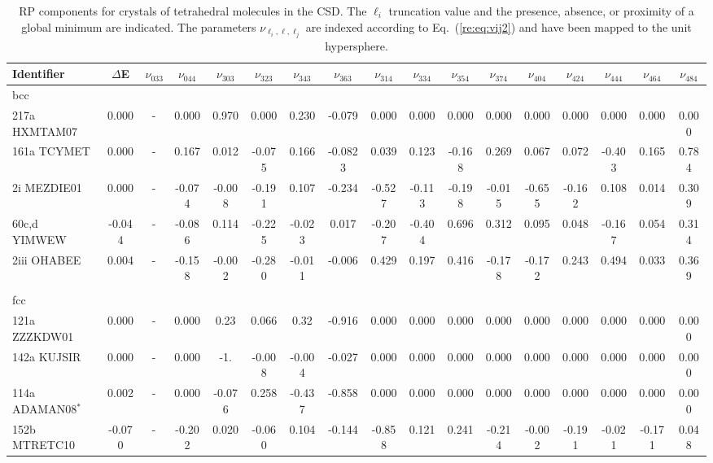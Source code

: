 \documentclass[preprint]{revtex4}
\begin{document}
\begin{table}[!ht]
\caption{RP components for crystals of tetrahedral molecules in the
CSD.  The $\ell_i$ truncation value and the presence, absence, or
proximity of a global minimum are indicated. The parameters
$\nu_{\ell_i,\ell,\ell_j}$ are indexed according to
Eq.~(\ref{re:eq:vij2}) and have been mapped to the unit hypersphere.}
\label{RPTop} \tiny
\begin{tabular}{lcccccccccccccccc}\hline
Identifier & $\Delta$E & $\nu_{033}$ & $\nu_{044}$ & $\nu_{303}$ &
$\nu_{323}$ & $\nu_{343}$ & $\nu_{363}$ & $\nu_{314}$ & $\nu_{334}$
& $\nu_{354}$ & $\nu_{374}$ & $\nu_{404}$ & $\nu_{424}$ &
$\nu_{444}$ & $\nu_{464}$ & $\nu_{484}$ \\
\hline
bcc\\
217a HXMTAM07 & 0.000 & - & 0.000 & 0.970 & 0.000 & 0.230 & -0.079 & 0.000 & 0.000 & 0.000 & 0.000 & 0.000 & 0.000 & 0.000 & 0.000 & 0.000 \\
161a TCYMET & 0.000 & - & 0.167 & 0.012 & -0.075 & 0.166 & -0.0823 & 0.039 & 0.123 & -0.168 & 0.269 & 0.067 & 0.072 & -0.403 & 0.165 & 0.784 \\
2i MEZDIE01 & 0.000 & - & -0.074 & -0.008 & -0.191 & 0.107 & -0.234 & -0.527 & -0.113 & -0.198 & -0.015 & -0.655 & -0.162 & 0.108 & 0.014 & 0.309 \\
60c,d YIMWEW & -0.044 & - & -0.086 & 0.114 & -0.225 & -0.023 & 0.017 & -0.207 & -0.404 & 0.696 & 0.312 & 0.095 & 0.048 & -0.167 & 0.054 & 0.314 \\
2iii OHABEE & 0.004 & - & -0.158 & -0.002 & -0.280 & -0.011 & -0.006 & 0.429 & 0.197 & 0.416 & -0.178 & -0.172 & 0.243 & 0.494 & 0.033 & 0.369 \\
\\
fcc\\
121a ZZZKDW01 & 0.000 & - & 0.000 & 0.23 & 0.066 & 0.32 & -0.916 & 0.000 & 0.000 & 0.000 & 0.000 & 0.000 & 0.000 & 0.000 & 0.000 & 0.000 \\
142a KUJSIR & 0.000 & - & 0.000 & -1. & -0.008 & -0.004 & -0.027 & 0.000 & 0.000 & 0.000 & 0.000 & 0.000 & 0.000 & 0.000 & 0.000 & 0.000 \\
114a ADAMAN08$^*$ & 0.002 & - & 0.000 & -0.076 & 0.258 & -0.437 & -0.858 & 0.000 & 0.000 & 0.000 & 0.000 & 0.000 & 0.000 & 0.000 & 0.000 & 0.000 \\
152b MTRETC10 & -0.070 & -  & -0.202 & 0.020 & -0.060 & 0.104 & -0.144 & -0.858 & 0.121 & 0.241 & -0.214 & -0.002 & -0.191 & -0.021 & -0.171 & 0.048 \\

\end{tabular}
\end{table}
\end{document}
